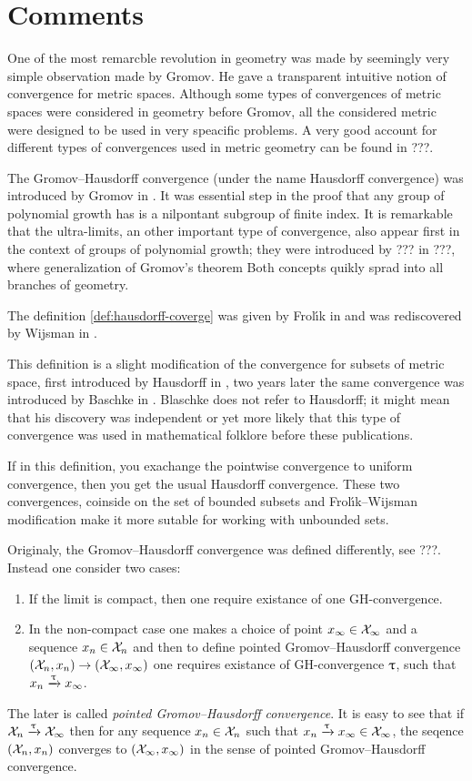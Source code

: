 \section{Comments}

One of the most remarcble revolution in geometry was made by seemingly very simple observation made by Gromov.
He gave a transparent intuitive notion of convergence for metric spaces.
Although some types of convergences of metric spaces
were considered in geometry before Gromov,
all the considered metric were designed to be used in very speacific problems.
A very good account for different types of convergences used in metric geometry can be found in ???.

The Gromov--Hausdorff convergence (under the name Hausdorff convergence)
was introduced by Gromov in \cite{gromov-polynomial-growth}.
It was essential step in the proof that any group of polynomial growth has is a nilpontant subgroup of finite index.
It is remarkable that the ultra-limits,
an other important type of convergence,
also appear first in the context of  groups of polynomial growth;
they were introduced by ??? in ???, where generalization of Gromov's theorem
Both concepts quikly sprad into all branches of geometry.


The definition \ref{def:hausdorff-coverge} was given by Frol\'{\i}k in \cite{frolik} %
and was rediscovered by Wijsman in \cite{wijsman}.

This definition is a slight modification of the convergence for subsets of metric space,
first introduced by Hausdorff in \cite{hausdorff}%
, two years later the same convergence was introduced by Baschke in \cite{blaschke}%
. 
Blaschke does not refer to Hausdorff; it might mean that his discovery was independent 
or yet more likely that this type of convergence was used in mathematical folklore before these publications. 

If in this definition, 
you exachange the pointwise convergence to uniform convergence,
then you get the usual Hausdorff convergence.
These two convergences, coinside on the 
set of bounded subsets
and Frol\'{\i}k--Wijsman modification make it more sutable for working with unbounded sets.

Originaly, the Gromov--Hausdorff convergence was defined differently, see ???.
Instead one consider two cases: 
\begin{enumerate}
\item If the limit is compact, then one require existance of one GH-convergence.
\item In the non-compact case one makes a choice of point $x_\infty\in\spc{X}_\infty$ and a sequence $x_n\in\spc{X}_n$ and then to define pointed Gromov--Hausdorff convergence $(\spc{X}_n,x_n)\to (\spc{X}_\infty, x_\infty)$ one requires existance of GH-convergence $\uptau$, such that $x_n\xrightarrow{\uptau}x_\infty$.
\end{enumerate}
The later is called \emph{pointed Gromov--Hausdorff convergence}.
It is easy to see that if $\mathcal{X}_n\xrightarrow{\uptau}\mathcal{X}_\infty$ then for any sequence $x_n\in\spc{X}_n$ 
such that $x_n\xto{\GH} x_\infty\in\spc{X}_\infty$, 
the seqence $(\mathcal{X}_n,x_n)$ 
converges to $(\mathcal{X}_\infty,x_\infty)$ 
in the sense of pointed Gromov--Hausdorff convergence.

